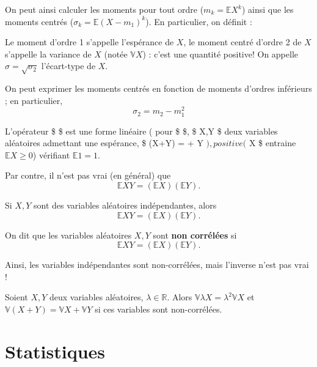 \documentclass[]{book}
\theoremstyle{definition}
\theoremstyle{definition}
\theoremstyle{definition}
\theoremstyle{remark}
\let\BeginKnitrBlock\begin \let\EndKnitrBlock\end
\begin{document}
On peut ainsi calculer les moments pour tout ordre (\(m_k = \mathbb{E} X^k\)) ainsi que les moments centrés (\(\sigma_k = \mathbb{E} (X - m_1)^k\)). En particulier, on définit :
\BeginKnitrBlock{definition}
\protect\hypertarget{def:unnamed-chunk-7}{}{\label{def:unnamed-chunk-7} } Le moment d'ordre 1 s'appelle l'espérance de \(X\), le moment centré d'ordre 2 de \(X\) s'appelle la variance de \(X\) (notée \(\mathbb{V}X\)) : c'est une quantité positive!
On appelle \(\sigma = \sqrt{\sigma_2}\) l'écart-type de \(X\).
\EndKnitrBlock{definition}

\BeginKnitrBlock{lemma}
\protect\hypertarget{lem:unnamed-chunk-8}{}{\label{lem:unnamed-chunk-8} }On peut exprimer les moments centrés en fonction de moments d'ordres inférieurs ; en particulier,
\[\sigma_2 = m_2 - m_1^2 \]
\EndKnitrBlock{lemma}

\BeginKnitrBlock{theorem}
\protect\hypertarget{thm:unnamed-chunk-9}{}{\label{thm:unnamed-chunk-9} }L'opérateur \$  \$ est une forme linéaire ( pour \$ \lambda \in {} \$,
\$ X,Y \$ deux variables aléatoires admettant une espérance,
\$  (X+\lambda Y) =  + \lambda {} Y \(), positive (\) X \$ entraine \(\mathbb{E}X \geq 0\)) vérifiant \(\mathbb{E}1 = 1\).
\EndKnitrBlock{theorem}

Par contre, il n'est pas vrai (en général) que \[ \mathbb{E} XY = (\mathbb{E}X) ( \mathbb{E} Y) . \]

\BeginKnitrBlock{lemma}
\protect\hypertarget{lem:unnamed-chunk-10}{}{\label{lem:unnamed-chunk-10} }Si \(X,Y\) sont des variables aléatoires indépendantes, alors
\[ \mathbb{E} XY = (\mathbb{E}X) ( \mathbb{E} Y) . \]
\EndKnitrBlock{lemma}

\BeginKnitrBlock{definition}
\protect\hypertarget{def:unnamed-chunk-11}{}{\label{def:unnamed-chunk-11} }On dit que les variables aléatoires \(X,Y\) sont \textbf{non corrélées} si \[ \mathbb{E} XY = (\mathbb{E}X) ( \mathbb{E} Y) . \]
\EndKnitrBlock{definition}

Ainsi, les variables indépendantes sont non-corrélées, mais l'inverse n'est pas vrai !

\BeginKnitrBlock{theorem}
\protect\hypertarget{thm:unnamed-chunk-12}{}{\label{thm:unnamed-chunk-12} }Soient \(X,Y\) deux variables aléatoires, \(\lambda \in \mathbb{R}\). Alors \(\mathbb{V} \lambda X = \lambda^2 \mathbb{V}X\) et \(\mathbb{V}(X+Y) = \mathbb{V}X+\mathbb{V}Y\) si ces variables sont non-corrélées.
\EndKnitrBlock{theorem}

\hypertarget{part-statistiques}{%
\part{Statistiques}\label{part-statistiques}}

\hypertarget{appendix-annexes}{%
\appendix}



\end{document}
